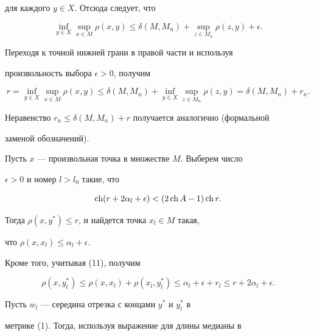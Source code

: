 для каждого $y \in X$. Отсюда следует, что 


$$


\inf\limits_{y \in X}{\sup\limits_{x \in M}{\rho (x,y)}} \leq


\delta(M,M_{n}) + \sup\limits_{z \in M_{n}}{\rho(z,y)} + \epsilon.


$$ 


Переходя к точной нижней грани в правой части и используя


произвольность выбора $\epsilon > 0$, получим


$$


r = \inf\limits_{y \in X}{\sup\limits_{x \in M}{\rho (x,y)}} \leq


\delta(M,M_{n}) + \inf\limits_{y \in X}{\sup\limits_{z \in


M_{n}}{\rho(z,y)}} = \delta(M,M_{n}) + r_{n}.


$$ 


Неравенство $r_{n} \leq \delta(M,M_{n}) + r$ получается аналогично (формальной 


заменой обозначений).


 


Пусть $x$ --- произвольная точка в множестве $M$. Выберем число


$\epsilon > 0$ и номер $l > l_{0}$ такие, что


\begin{equation}


\ch(r + 2\alpha_{l} + \epsilon) < (2\ch A - 1)\ch r.


\end{equation}


Тогда $\rho(x,y^{*}) \leq r$, и найдется точка $x_{l} \in M$ такая,


что $\rho(x,x_{l}) \leq \alpha_{l} + \epsilon.$ 


Кроме того, учитывая (11), получим


\begin{equation}


\rho(x,y^{*}_{l}) \leq \rho(x,x_{l}) + \rho(x_{l},y^{*}_{l}) \leq


\alpha_{l} + \epsilon + r_{l} \leq r + 2\alpha_{l} + \epsilon.


\end{equation}


Пусть $w_{l}$ --- середина отрезка с концами $y^{*}$ и $y^{*}_{l}$ в


метрике (1). Тогда, используя выражение для длины медианы в


